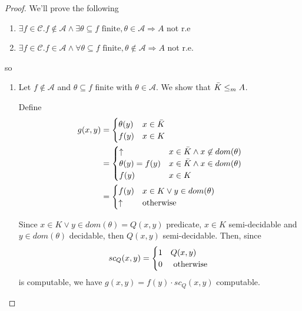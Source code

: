\begin{proof}
  We'll prove the following
  \begin{enumerate}
    \item $ \exists f \in \mathcal{C} . f \not\in \mathcal{A} \land
    \exists\theta\subseteq f \mbox{ finite}, \theta\in\mathcal{A} \Rightarrow
    A$ not r.e
    \item $ \exists f \in \mathcal{C}. f\in\mathcal{A} \land
    \forall\theta\subseteq f \mbox{ finite}, \theta\not\in\mathcal{A}\Rightarrow
    A$ not r.e.
  \end{enumerate}

  so
  \begin{enumerate}
    \item
    Let $ f\not\in \mathcal{A}$ and $\theta \subseteq f$ finite with $\theta \in \mathcal{A}$.
    We show that $
    \bar{K}\leq_m A $.

    Define
    \begin{equation*}
      \begin{aligned}
        g(x,y) & = \begin{cases}
          \theta(y) & x \in \bar{K} \\
          f(y) & x \in K
        \end{cases} \\
               & = \begin{cases}
                 \uparrow & x \in \bar{K} \land x \not\in dom(\theta) \\
                 \theta(y) = f(y) & x \in \bar{K} \land x \in dom(\theta) \\
                 f(y) & x\in K
               \end{cases}\\
               &= \begin{cases}
                 f(y) & x \in K\lor y\in dom(\theta) \\
                 \uparrow & $otherwise $
               \end{cases}
      \end{aligned}
    \end{equation*}

    Since $ x\in K\lor y\in dom(\theta) = Q(x,y)$ predicate, $x\in K$
    semi-decidable and $y \in dom(\theta)$ decidable, then $ Q(x,y) $
    semi-decidable.
    Then, since
    \begin{equation*}
    sc_Q(x,y) = \begin{cases}
        1 & Q(x,y) \\
        0 & $ otherwise $
      \end{cases}
    \end{equation*}
  is computable, we have $g(x, y) = f(y) \cdot sc_Q(x,y)$ computable.


\end{enumerate}
\end{proof}
